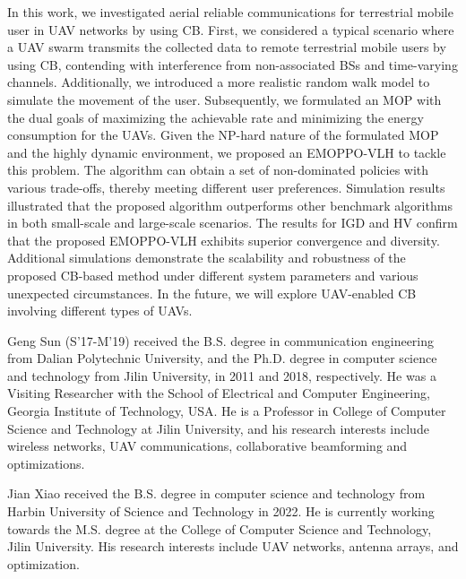 \documentclass[10pt,journal,compsoc]{IEEEtran}
\begin{document}
\par In this work, we investigated aerial reliable communications for terrestrial mobile user in UAV networks by using CB. First, we considered a typical scenario where a UAV swarm transmits the collected data to remote terrestrial mobile users by using CB, contending with interference from non-associated BSs and time-varying channels. Additionally, we introduced a more realistic random walk model to simulate the movement of the user. Subsequently, we formulated an MOP with the dual goals of maximizing the achievable rate and minimizing the energy consumption for the UAVs. Given the NP-hard nature of the formulated MOP and the highly dynamic environment, we proposed an EMOPPO-VLH to tackle this problem. The algorithm can obtain a set of non-dominated policies with various trade-offs, thereby meeting different user preferences. Simulation results illustrated that the proposed algorithm outperforms other benchmark algorithms in both small-scale and large-scale scenarios. The results for IGD and HV confirm that the proposed EMOPPO-VLH exhibits superior convergence and diversity. Additional simulations demonstrate the scalability and robustness of the proposed CB-based method under different system parameters and various unexpected circumstances. In the future, we will explore UAV-enabled CB involving different types of UAVs.





\vspace{-10 mm}
\begin{IEEEbiography}{Geng Sun}
(S'17-M'19) received the B.S. degree in communication engineering from Dalian Polytechnic University, and the Ph.D. degree in computer science and technology from Jilin University, in 2011 and 2018, respectively. He was a Visiting Researcher with the School of Electrical and Computer Engineering, Georgia Institute of Technology, USA. He is a Professor in College of Computer Science and Technology at Jilin University, and his research interests include wireless networks, UAV communications, collaborative beamforming and optimizations.
\end{IEEEbiography}

\vspace{-10 mm}
\begin{IEEEbiography}{Jian Xiao}
received the B.S. degree in computer science and technology from Harbin University of Science and Technology in 2022. He is currently working towards the M.S. degree at the College of Computer Science and Technology, Jilin University. His research interests include UAV networks, antenna arrays, and optimization.
\end{IEEEbiography}
\end{document}
